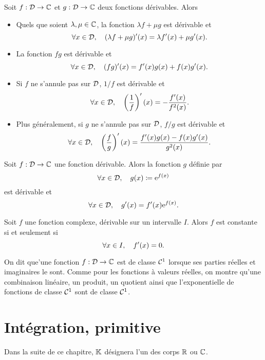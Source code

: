 \documentclass{magnoliaold}
\begin{document}
\begin{proposition}[utile=-3, nom={Théorèmes usuels}]
Soit $f:\mathcal{D}\to\mathbb{C}$ et $g:\mathcal{D}\to\mathbb{C}$ deux fonctions dérivables. Alors
\begin{itemize}
\item Quels que soient $\lambda,\mu\in\mathbb{C}$, la fonction
  $\lambda f+\mu g$ est dérivable et
  \[\forall x\in\mathcal{D},\quad (\lambda f+\mu g)'(x)=\lambda f'(x)+\mu g'(x).\]
\item La fonction $fg$ est dérivable et
  \[\forall x\in\mathcal{D},\quad (fg)'(x)=f'(x)g(x)+f(x)g'(x).\]
\item Si $f$ ne s'annule pas sur $\mathcal{D}$, $1/f$ est dérivable et
  \[\forall x\in\mathcal{D},\quad \left(\frac{1}{f}\right)'(x)=-\frac{f'(x)}{f^2(x)}.\]
\item Plus généralement, si $g$ ne s'annule pas sur $\mathcal{D}$, $f/g$ est dérivable
  et
  \[\forall x\in\mathcal{D},\quad \left(\frac{f}{g}\right)'(x)=\frac{f'(x)g(x)-f(x)g'(x)}{g^2(x)}.\]
\end{itemize}
\end{proposition}

\begin{proposition}[utile=-3]
Soit $f:\mathcal{D}\to\mathbb{C}$ une fonction dérivable. Alors la fonction $g$ définie par
\[\forall x\in\mathcal{D},\quad g(x)\coloneqq {\rm e}^{f(x)}\]
est dérivable et
\[\forall x\in\mathcal{D},\quad g'(x)=f'(x){\rm e}^{f(x)}.\]
\end{proposition}


\begin{proposition}[utile=3]
  Soit $f$ une fonction complexe, dérivable sur un intervalle $I$. Alors $f$ est
  constante si et seulement si
  \[\forall x\in I ,\quad f'(x)=0.\]
  \end{proposition}

\begin{remarqueUnique}
\remarque On dit que'une fonction $f:\mathcal{D}\to\mathbb{C}$ est de classe $\mathcal{C}^{1}$ lorsque ses
  parties réelles et imaginaires le sont. Comme pour les fonctions à valeurs réelles, on
  montre qu'une combinaison linéaire, un produit, un quotient ainsi que l'exponentielle de fonctions
  de classe $\mathcal{C}^{1}$ sont de classe $\mathcal{C}^{1}$.
\end{remarqueUnique}

\section{Intégration, primitive}

Dans la suite de ce chapitre, $\mathbb{K}$ désignera l'un des corps $\mathbb{R}$ ou $\mathbb{C}$.
\end{document}
